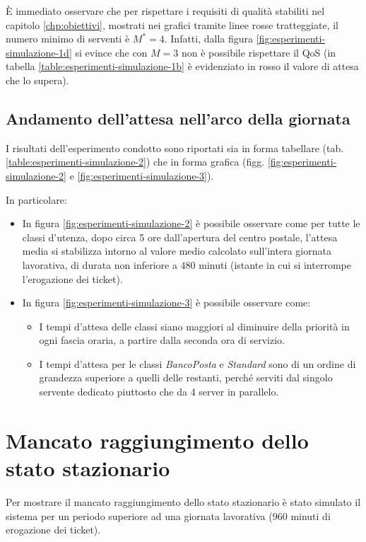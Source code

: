È immediato osservare che per rispettare i requisiti di qualità stabiliti nel capitolo \ref{chp:obiettivi}, mostrati nei grafici tramite linee rosse tratteggiate, il numero minimo di serventi è $M^* = 4$. Infatti, dalla figura \ref{fig:esperimenti-simulazione-1d} si evince che con $M = 3$ non è possibile rispettare il QoS (in tabella \ref{table:esperimenti-simulazione-1b} è evidenziato in {\color{red}rosso} il valore di  attesa che lo supera).

\subsection*{Andamento dell'attesa nell'arco della giornata}
I risultati dell'esperimento condotto sono riportati sia in forma tabellare (tab. \ref{table:esperimenti-simulazione-2}) che in forma grafica (figg. \ref{fig:esperimenti-simulazione-2} e \ref{fig:esperimenti-simulazione-3}).

In particolare:
\begin{itemize}
\item In figura \ref{fig:esperimenti-simulazione-2} è possibile osservare come per tutte le classi d'utenza, dopo circa 5 ore dall'apertura del centro postale, l'attesa media si stabilizza intorno al valore medio calcolato sull'intera giornata lavorativa, di durata non inferiore a 480 minuti (istante in cui si interrompe l'erogazione dei ticket).
\item In figura \ref{fig:esperimenti-simulazione-3} è possibile osservare come:
\begin{itemize}
\item I tempi d'attesa delle classi siano maggiori al diminuire della priorità in ogni fascia oraria, a partire dalla seconda ora di servizio.
\item I tempi d'attesa per le classi \sr{} \textsl{BancoPosta} e \textsl{Standard} sono di un ordine di grandezza superiore a quelli delle restanti, perché serviti dal singolo servente dedicato piuttosto che da 4 server in parallelo.
\end{itemize}
\end{itemize}

\section{Mancato raggiungimento dello stato stazionario}\label{sec:esperimenti-simulazione-stazionario}
Per mostrare il mancato raggiungimento dello stato stazionario è stato simulato il sistema per un periodo superiore ad una giornata lavorativa ($960$ minuti di erogazione dei ticket). 

